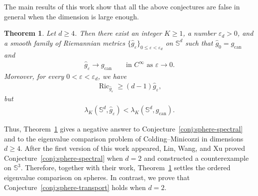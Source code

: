 \documentclass[11pt,reqno]{amsart}
\numberwithin{equation}{section}
\newtheorem{mainthm}{Theorem}
\theoremstyle{definition}
\theoremstyle{remark}
\newcommand{\lam}{\lambda}
\newcommand{\0}{\emptyset}
\newcommand{\veps}{\varepsilon}
\newcommand{\bbS}{\mathbb S}
\newcommand{\Ric}{\operatorname{Ric}}
\newcommand{\can}{\mathrm{can}}
\begin{document}
The main results of this work show that all the above conjectures are false in general when the dimension is large enough.
\begin{mainthm}\label{thm:sphere-main}
Let $d\geq4$. Then there exist an integer $K\geq1$, a number
$\veps_d>0$, and a smooth family of Riemannian metrics
$\{\widehat g_\veps\}_{0\leq\veps<\veps_d}$ on $\bbS^d$ such that
$\widehat g_0=g_\can$ and
\begin{align}\label{eqn:sphere-local-convergence}
        \widehat g_\veps
        \rightarrow
        g_\can
        \qquad
        \text{in }C^\infty
        \text{ as }\veps\to0.
\end{align}
Moreover, for every $0<\veps<\veps_d$, we have
\begin{align}\label{eqn:sphere-local-Ricci}
        \Ric_{\widehat g_\veps}
        \geq
        (d-1)\widehat g_\veps,
\end{align}
but
\begin{align}\label{eqn:index-K}
        \lam_K(\bbS^d,\widehat g_\veps)
        <
        \lam_K(\bbS^d,g_\can).
\end{align}
\end{mainthm}
Thus, Theorem~\ref{thm:sphere-main} gives a negative answer to
Conjecture~\ref{conj:sphere-spectral} and to the eigenvalue comparison problem of Colding--Minicozzi in dimensions $d\geq4$. After the first version of this work appeared, Lin, Wang, and Xu \cite{lin2026eigenvalues} proved Conjecture~\ref{conj:sphere-spectral} when $d=2$ and constructed a counterexample on $\bbS^3$. Therefore, together with their work, Theorem~\ref{thm:sphere-main} settles the ordered eigenvalue comparison on spheres.
In contrast, we prove that Conjecture~\ref{conj:sphere-transport}
holds when $d=2$.
\end{document}
